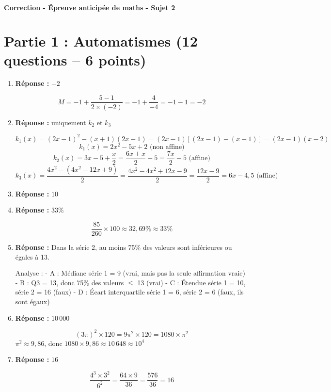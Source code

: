 \documentclass[a4paper,12pt]{article}
\begin{document}
\begin{center}\Large\textbf{Correction - Épreuve anticipée de maths - Sujet 2}\end{center}

\section*{Partie 1 : Automatismes (12 questions -- 6 points)}

\begin{enumerate}

\item \textbf{Réponse :}  \(-2\)

\[
M = -1 + \frac{5 - 1}{2 \times (-2)} = -1 + \frac{4}{-4} = -1 - 1 = -2
\]

\item \textbf{Réponse :}  uniquement \(k_2\) et \(k_3\)

\[
k_1(x) = (2x-1)^2 - (x+1)(2x-1) = (2x-1)[(2x-1)-(x+1)] = (2x-1)(x-2)
\]
\[
k_1(x) = 2x^2 -5x +2 \text{ (non affine)}
\]
\[
k_2(x) = 3x - 5 + \frac{x}{2} = \frac{6x + x}{2} - 5 = \frac{7x}{2} - 5 \text{ (affine)}
\]
\[
k_3(x) = \frac{4x^2 - (4x^2 - 12x + 9)}{2} = \frac{4x^2 - 4x^2 + 12x - 9}{2} = \frac{12x - 9}{2} = 6x - 4,5 \text{ (affine)}
\]

\item \textbf{Réponse :}  \(10\)
\item \textbf{Réponse :}  \(33\%\)

\[
\frac{85}{260} \times 100 \approx 32,69\% \approx 33\%
\]

\item \textbf{Réponse :}  Dans la série 2, au moins \(75\%\) des valeurs sont inférieures ou égales à 13.

Analyse :
- A : Médiane série 1 = 9 (vrai, mais pas la seule affirmation vraie)
- B : Q3 = 13, donc 75\% des valeurs \(\leq\) 13 (vrai)
- C : Étendue série 1 = 10, série 2 = 16 (faux)
- D : Écart interquartile série 1 = 6, série 2 = 6 (faux, ils sont égaux)

\item \textbf{Réponse :}  \(10\,000\)

\[
(3\pi)^2 \times 120 = 9\pi^2 \times 120 = 1080 \times \pi^2
\]
\(\pi^2 \approx 9,86\), donc \(1080 \times 9,86 \approx 10\,648 \approx 10^4\)

\item \textbf{Réponse :}  \(16\)

\[
\frac{4^3 \times 3^2}{6^2} = \frac{64 \times 9}{36} = \frac{576}{36} = 16
\]


\end{enumerate}
\end{document}
